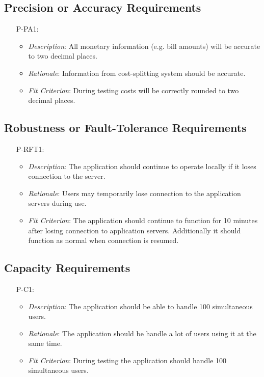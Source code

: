 \documentclass[12pt]{article}
\begin{document}
\subsection{Precision or Accuracy Requirements}
\noindent \begin{itemize}
    \item[P-PA1:] 
        \begin{itemize}
            \item \textit{Description}: All monetary information (e.g. bill amounts) will be accurate to two decimal places. 
            \item \textit{Rationale}: Information from cost-splitting system should be accurate.
            \item \textit{Fit Criterion}: During testing costs will be correctly rounded to two decimal places.
        \end{itemize}
\end{itemize}
\subsection{Robustness or Fault-Tolerance Requirements}
\noindent \begin{itemize}
    \item[P-RFT1:] 
        \begin{itemize}
            \item \textit{Description}: The application should continue to operate locally if it loses connection to the server.
            \item \textit{Rationale}: Users may temporarily lose connection to the application servers during use.
            \item \textit{Fit Criterion}: The application should continue to function for 10 minutes after losing connection to application servers. Additionally it should function as normal when connection is resumed.
        \end{itemize}
\end{itemize}
\subsection{Capacity Requirements}
\noindent \begin{itemize}
    \item[P-C1:] 
        \begin{itemize}
            \item \textit{Description}: The application should be able to handle 100 simultaneous users.
            \item \textit{Rationale}: The application should be handle a lot of users using it at the same time.
            \item \textit{Fit Criterion}: During testing the application should handle 100 simultaneous users.
        \end{itemize}
\end{itemize}
\end{document}
